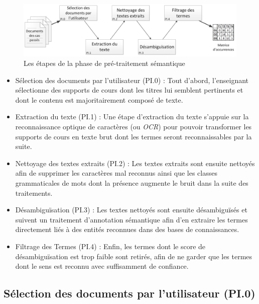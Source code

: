 \begin{figure}[ht]
\centering
\centerline{  %
\includegraphics[scale=0.55]{3-Methode-CREA/images/schema_pre-traitement_semantique_ESCALIER.png}
}
\caption{Les étapes de la phase de pré-traitement sémantique}
\label{figure:3-I-PreTraitementSemantique}
\end{figure}

\begin{itemize}
\item Sélection des documents par l'utilisateur (PI.0) : Tout d'abord, l'enseignant sélectionne des supports de cours dont les titres lui semblent pertinents et dont le contenu est majoritairement composé de texte.
\item Extraction du texte (PI.1) : Une étape d'extraction du texte s'appuie sur la reconnaissance optique de caractères (ou \textit{OCR}) pour pouvoir transformer les supports de cours en texte brut dont les termes seront reconnaissables par la suite.
\item Nettoyage des textes extraits (PI.2) : Les textes extraits sont ensuite nettoyés afin de supprimer les caractères mal reconnus ainsi que les classes grammaticales de mots dont la présence augmente le bruit dans la suite des traitements.
\item Désambiguïsation (PI.3) : Les textes nettoyés sont ensuite désambiguïsés et suivent un traitement d'annotation sémantique afin d'en extraire les termes directement liés à des entités reconnues dans des bases de connaissances.
\item Filtrage des Termes (PI.4) : Enfin, les termes dont le score de désambiguïsation est trop faible sont retirés, afin de ne garder que les termes dont le sens est reconnu avec suffisamment de confiance.
\end{itemize}



\subsection{Sélection des documents par l'utilisateur (PI.0)}
\label{subsection:CREA:SelectionDocuments}


